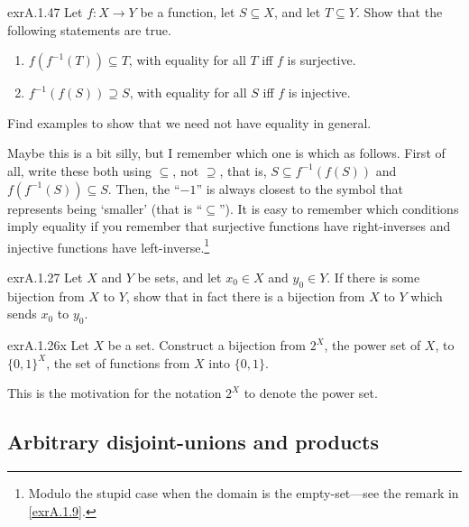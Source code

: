 \begin{exr}{}{exrA.1.47}
Let $f\colon X\rightarrow Y$ be a function, let $S\subseteq X$, and let $T\subseteq Y$.  Show that the following statements are true.
\begin{enumerate}
\item \label{enmA.1.47.i}$f\left( f^{-1}(T)\right) \subseteq T$, with equality for all $T$ iff $f$ is surjective.
\item \label{enmA.1.47.ii}$f^{-1}\left( f(S)\right) \supseteq S$, with equality for all $S$ iff $f$ is injective.
\end{enumerate}
Find examples to show that we need not have equality in general.
\begin{rmk}
Maybe this is a bit silly, but I remember which one is which as follows.  First of all, write these both using $\subseteq$, not $\supseteq$, that is, $S\subseteq f^{-1}(f(S))$ and $f(f^{-1}(S))\subseteq S$.  Then, the ``$-1$'' is always closest to the symbol that represents being `smaller' (that is ``$\subseteq$'').  It is easy to remember which conditions imply equality if you remember that surjective functions have right-inverses and injective functions have left-inverse.\footnote{Modulo the stupid case when the domain is the empty-set---see the remark in \cref{exrA.1.9}.}
\end{rmk}
\end{exr}
\begin{exr}{}{exrA.1.27}
Let $X$ and $Y$ be sets, and let $x_0\in X$ and $y_0\in Y$.  If there is some bijection from $X$ to $Y$, show that in fact there is a bijection from $X$ to $Y$ which sends $x_0$ to $y_0$.
\end{exr}
\begin{exr}{}{exrA.1.26x}
Let $X$ be a set.  Construct a bijection from $2^X$, the power set of $X$, to $\{ 0,1\}^X$, the set of functions from $X$ into $\{ 0,1\}$.
\begin{rmk}
This is the motivation for the notation $2^X$ to denote the power set.
\end{rmk}
\end{exr}

\subsection{Arbitrary disjoint-unions and products}

